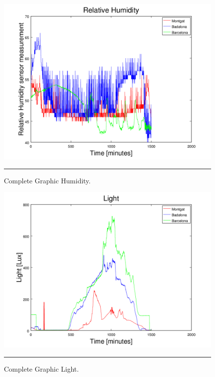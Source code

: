 \documentclass[12pt, a4paper,twoside]{tesi_upf}
\begin{document}
    \begin{figure}[H]
      \centering
        \includegraphics[page=1,scale=0.8]{./Figures/CompleteGraphicHumidity.png}
      \rule{35em}{0.5pt}
      \caption[Complete Graphic Humidity]{Complete Graphic Humidity.}
      \label{fig:CompleteGraphicHumidity}
    \end{figure}
    
    \begin{figure}[H]
      \centering
        \includegraphics[page=1,scale=0.8]{./Figures/CompleteGraphicLight.png}
      \rule{35em}{0.5pt}
      \caption[Complete Graphic Light]{Complete Graphic Light.}
      \label{fig:CompleteGraphicLight}
    \end{figure}
    
\end{document}
